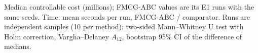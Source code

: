 \begin{table}[!t]
\centering
\footnotesize
\caption{Equal wall-clock time (X1): adapted GA and PSO receive the number of evaluations they can perform in the mean time FMCG-ABC needs for 50{,}000 evaluations; seeds 1--10, main instance.}\label{tab:x1}
\par\smallskip\parbox{0.95\linewidth}{\scriptsize Median controllable cost (millions); FMCG-ABC values are its E1 runs with the same seeds. Time: mean seconds per run, FMCG-ABC / comparator. Runs are independent samples (10 per method): two-sided Mann--Whitney U test with Holm correction, Vargha--Delaney $A_{12}$, bootstrap 95\% CI of the difference of medians.}
\end{table}
